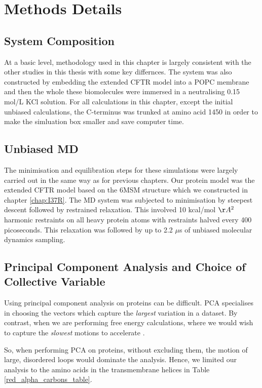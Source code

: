 \section{Methods Details}
\subsection{System Composition}
At a basic level, methodology used in this chapter is largely consistent with the other studies in this thesis with some key differnces. The system was also constructed by embedding the extended CFTR model into a POPC membrane and then the whole these biomolecules were immersed in a neutralising 0.15 mol/L KCl solution. For all calculations in this chapter, except the initial unbiased calculations, the C-terminus was trunked at amino acid 1450 in order to make the simluation box smaller and save computer time.

\subsection{Unbiased MD }
The minimisation and equilibration steps for these simulations were largely carried out in the same way as for previous chapters. Our protein model was the extended CFTR model based on the 6MSM structure \cite{zhang2018} which we constructed in chapter \ref{chap:I37R}. The MD system was subjected to minimisation by steepest descent followed by restrained relaxation. This involved 10 kcal/mol $\AA^2$ harmonic restraints on all heavy protein atoms with restraints halved every 400 picoseconds. This relaxation was followed by up to 2.2 $\mu$s of unbiased molecular dynamics sampling.

\subsection {Principal Component Analysis and Choice of Collective Variable}
Using principal component analysis on proteins can be difficult. PCA specialises in choosing the vectors which capture the \textit{largest} variation in a dataset. By contrast, when we are performing free energy calculations, where we would wish to capture the \textit{slowest} motions to accelerate \cite{noe2001}. 

So, when performing PCA on proteins, without excluding them, the motion of large, disordered loops would dominate the analysis. Hence, we limited our analysis to the amino acids in the transmembrane helices in Table \ref{red_alpha_carbons_table}. 

